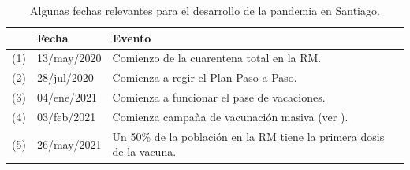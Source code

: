 \begin{table}[h!]
\centering
\begin{tabular}{|| m{1cm} m{3cm} m{8cm}||} 
 \hline
 & \textbf{Fecha} & \textbf{Evento} \\
 \hline 
 (1) & 13/may/2020 & Comienzo de la cuarentena total en la RM.\\
 (2) & 28/jul/2020 & Comienza a regir el Plan Paso a Paso.\\
 (3) & 04/ene/2021 & Comienza a funcionar el pase de vacaciones.\\ 
 (4) & 03/feb/2021 & Comienza campaña de vacunación masiva (ver \cite{MINSAL2021}).\\
 (5) & 26/may/2021 &  Un 50\% de la población en la RM tiene la primera dosis de la vacuna. \\
 \hline
\end{tabular}
\caption{Algunas fechas relevantes para el desarrollo de la pandemia en Santiago.}
\label{table:fechas-relevantes}
\end{table}



